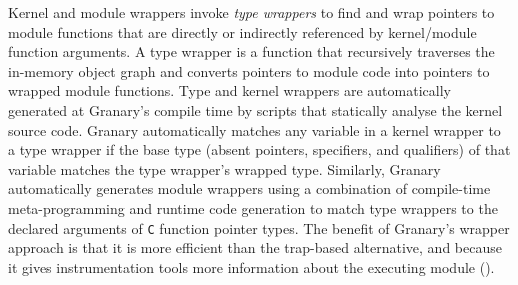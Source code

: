 \documentclass[preprint]{sigplanconf}
\begin{document}
Kernel and module wrappers invoke \emph{type wrappers} to find and wrap pointers to module functions that are directly or indirectly referenced by kernel/module function arguments. A type wrapper is a function that recursively  traverses the in-memory object graph and converts pointers to module code into pointers to wrapped module functions. Type and kernel wrappers are automatically generated at Granary's compile time by scripts that statically analyse the kernel source code. Granary automatically matches any variable in a kernel wrapper to a type wrapper if the base type (absent pointers, specifiers, and qualifiers) of that variable matches the type wrapper's wrapped type. Similarly, Granary automatically generates module wrappers using a combination of compile-time meta-programming and runtime code generation to match type wrappers to the declared arguments of \texttt{C} function pointer types.  The benefit of Granary's wrapper approach is that it is more efficient than the trap-based alternative, and because it gives instrumentation tools more information about the executing module ().









\end{document}
